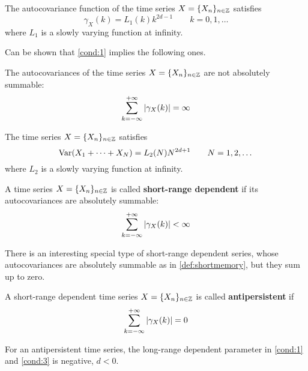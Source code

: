 \begin{condition}\label{cond:1}
	The autocovariance function of the time series $X = \{ X_n \}_{n \in \mathbb{Z}}$ satisfies
	\begin{equation*}
		\gamma_X(k) = L_1(k) k^{2d -1} \qquad k=0,1,\dots
	\end{equation*}
	where $L_1$ is a slowly varying function at infinity.
\end{condition}

Can be shown that \autoref{cond:1} implies the following ones.\\ 
\begin{condition}\label{cond:2}
	The autocovariances of the time series $X = \{ X_n \}_{n \in \mathbb{Z}}$ are not absolutely summable:
	\begin{equation*}
		\sum_{k=-\infty}^{+\infty} \abs{\gamma_X(k)} = \infty
	\end{equation*}
\end{condition}

\begin{condition}\label{cond:3}
	The time series $X = \{ X_n \}_{n \in \mathbb{Z}}$ satisfies
	\begin{equation*}
		\textnormal{Var}(X_1 + \dots + X_N) = L_2(N) N^{2d + 1} \qquad N = 1, 2, \dots
	\end{equation*}
	where $L_2$ is a slowly varying function at infinity.
\end{condition}

\begin{definition}\label{def:shortmemory}
	A time series $X = \{ X_n \}_{n \in \mathbb{Z}}$ is called \textbf{short-range dependent} if its autocovariances are absolutely summable:
	\begin{equation*}
		\sum_{k=-\infty}^{+\infty} \abs{\gamma_X(k)} < \infty
	\end{equation*}
\end{definition}

There is an interesting special type of short-range dependent series, whose autocovariances are absolutely summable as in \autoref{def:shortmemory}, but they sum up to zero.
\begin{definition}
	A short-range dependent time series $X = \{ X_n \}_{n \in \mathbb{Z}}$ is called \textbf{antipersistent} if
	\begin{equation*}
		\sum_{k=-\infty}^{+\infty} \abs{\gamma_X(k)} = 0
	\end{equation*}
\end{definition}

For an antipersistent time series, the long-range dependent parameter in \autoref{cond:1} and \autoref{cond:3} is negative, $d < 0$.

